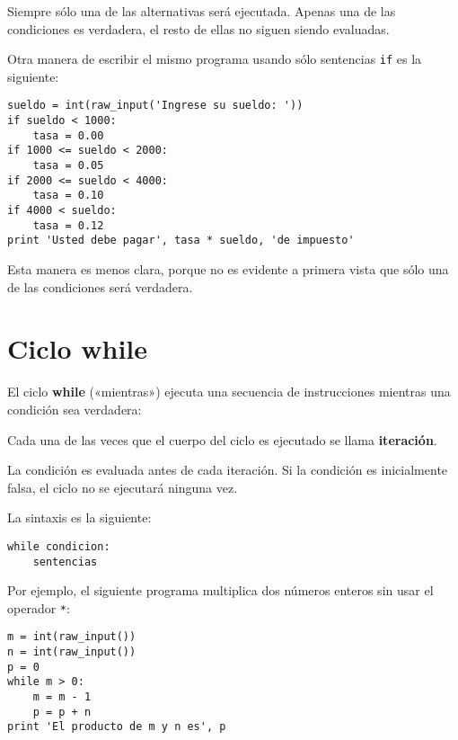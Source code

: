 Siempre sólo una de las alternativas será ejecutada. Apenas una de las
condiciones es verdadera, el resto de ellas no siguen siendo evaluadas.

Otra manera de escribir el mismo programa usando sólo sentencias
\lstinline!if! es la siguiente:

\begin{lstlisting}
sueldo = int(raw_input('Ingrese su sueldo: '))
if sueldo < 1000:
    tasa = 0.00
if 1000 <= sueldo < 2000:
    tasa = 0.05
if 2000 <= sueldo < 4000:
    tasa = 0.10
if 4000 < sueldo:
    tasa = 0.12
print 'Usted debe pagar', tasa * sueldo, 'de impuesto'
\end{lstlisting}

Esta manera es menos clara, porque no es evidente a primera vista que
sólo una de las condiciones será verdadera.

\section{Ciclo while}

El ciclo \textbf{while} («mientras») ejecuta una secuencia de
instrucciones mientras una condición sea verdadera:

\begin{center}
  
\end{center}

Cada una de las veces que el cuerpo del ciclo es ejecutado se llama
\textbf{iteración}.

La condición es evaluada antes de cada iteración. Si la condición es
inicialmente falsa, el ciclo no se ejecutará ninguna vez.

La sintaxis es la siguiente:

\begin{lstlisting}
while condicion:
    sentencias
\end{lstlisting}

Por ejemplo, el siguiente programa multiplica dos números enteros sin
usar el operador \lstinline!*!:

\begin{lstlisting}
m = int(raw_input())
n = int(raw_input())
p = 0
while m > 0:
    m = m - 1
    p = p + n
print 'El producto de m y n es', p
\end{lstlisting}

